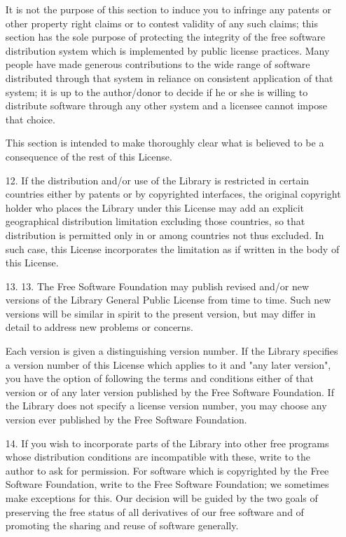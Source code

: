 \begin{itemize}
It is not the purpose of this section to induce you to infringe any
patents or other property right claims or to contest validity of any
such claims; this section has the sole purpose of protecting the
integrity of the free software distribution system which is
implemented by public license practices.  Many people have made
generous contributions to the wide range of software distributed
through that system in reliance on consistent application of that
system; it is up to the author/donor to decide if he or she is willing
to distribute software through any other system and a licensee cannot
impose that choice.

This section is intended to make thoroughly clear what is believed to
be a consequence of the rest of this License.

 \item[12.]  If the distribution and/or use of the Library is restricted in
certain countries either by patents or by copyrighted interfaces, the
original copyright holder who places the Library under this License may add
an explicit geographical distribution limitation excluding those countries,
so that distribution is permitted only in or among countries not thus
excluded.  In such case, this License incorporates the limitation as if
written in the body of this License.

\item[13.] 
  13. The Free Software Foundation may publish revised and/or new
versions of the Library General Public License from time to time.
Such new versions will be similar in spirit to the present version,
but may differ in detail to address new problems or concerns.

Each version is given a distinguishing version number.  If the Library
specifies a version number of this License which applies to it and
"any later version", you have the option of following the terms and
conditions either of that version or of any later version published by
the Free Software Foundation.  If the Library does not specify a
license version number, you may choose any version ever published by
the Free Software Foundation.

\item[14.]  If you wish to incorporate parts of the Library into other free
programs whose distribution conditions are incompatible with these,
write to the author to ask for permission.  For software which is
copyrighted by the Free Software Foundation, write to the Free
Software Foundation; we sometimes make exceptions for this.  Our
decision will be guided by the two goals of preserving the free status
of all derivatives of our free software and of promoting the sharing
and reuse of software generally.


\end{itemize}
